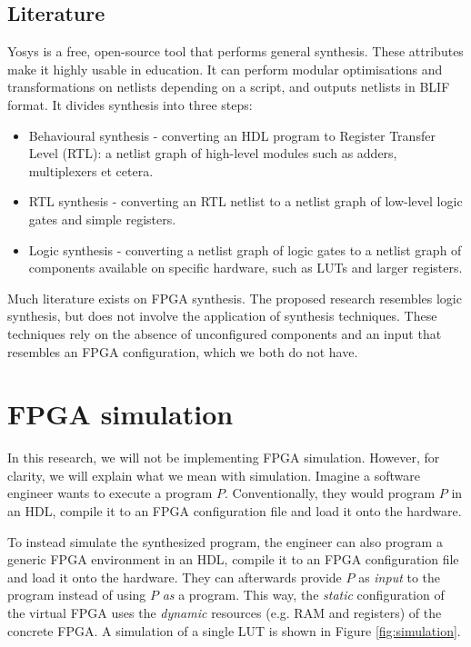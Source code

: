 \subsection{Literature}
Yosys\cite{wolf2016yosys} is a free, open-source tool that performs general synthesis. These attributes make it highly usable in education. It can perform modular optimisations and transformations on netlists depending on a script, and outputs netlists in BLIF\cite{Brayton} format. It divides synthesis into three steps:
\begin{itemize}
\item Behavioural synthesis - converting an HDL program to Register Transfer Level (RTL): a netlist graph of high-level modules such as adders, multiplexers et cetera.
\item RTL synthesis - converting an RTL netlist to a netlist graph of low-level logic gates and simple registers. 
\item Logic synthesis - converting a netlist graph of logic gates to a netlist graph of components available on specific hardware, such as LUTs and larger registers.
\end{itemize}

Much literature exists on FPGA synthesis. The proposed research resembles logic synthesis, but does not involve the application of synthesis techniques. These techniques rely on the absence of unconfigured components and an input that resembles an FPGA configuration, which we both do not have.

\section{FPGA simulation}
\label{sec:simulation}
In this research, we will not be implementing FPGA simulation. However, for clarity, we will explain what we mean with simulation. Imagine a software engineer wants to execute a program $P$. Conventionally, they would program $P$ in an HDL, compile it to an FPGA configuration file and load it onto the hardware.

To instead simulate the synthesized program, the engineer can also program a generic FPGA environment in an HDL, compile it to an FPGA configuration file and load it onto the hardware. They can afterwards provide $P$ as \textit{input} to the program instead of using $P$ \textit{as} a program. This way, the \textit{static} configuration of the virtual FPGA uses the \textit{dynamic} resources (e.g. RAM and registers) of the concrete FPGA. A simulation of a single LUT is shown in Figure \ref{fig:simulation}.

